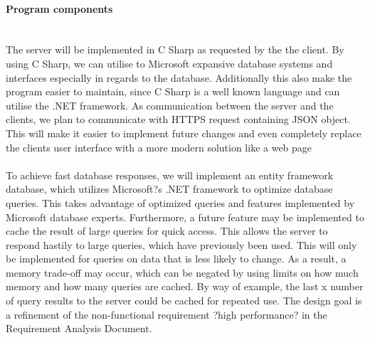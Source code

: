 \paragraph{Program components}\mbox{}\\
The server will be implemented in C Sharp as requested by the the client. By using C Sharp, we can utilise to Microsoft expansive database systems and interfaces especially in regards to the database. Additionally this also make the program easier to maintain, since C Sharp is a well known language and can utilise the .NET framework. As communication between the server and the clients, we plan to communicate with HTTPS  request containing JSON object. This will make it easier to implement future changes and even completely replace the clients user interface with a more modern solution like a web page
\\\\
To achieve fast database responses, we will implement an entity framework database, which utilizes Microsoft?s .NET framework to optimize database queries. This takes advantage of optimized queries and features implemented by Microsoft database experts. Furthermore, a future feature may be implemented to cache the result of large queries for quick access. This allows the server to respond hastily to large queries, which have previously been used. This will only be implemented for queries on data that is less likely to change. As a result, a memory trade-off may occur, which can be negated by using limits on how much memory and how many queries are cached. By way of example, the last x number of query results to the server could be cached for repeated use. The design goal is a refinement of the non-functional requirement ?high performance? in the Requirement Analysis Document.